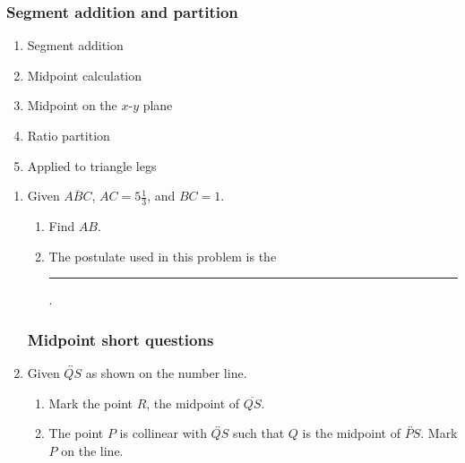 \documentclass[12pt, twoside]{article}
\begin{document}
\subsubsection*{Segment addition and partition}
\begin{enumerate}
  \item Segment addition
  \item Midpoint calculation
  \item Midpoint on the $x$-$y$ plane
  \item Ratio partition
  \item Applied to triangle legs
  \end{enumerate}

\begin{enumerate}
\subsubsection*{Segment addition short questions}
  \item Given $\overline{ABC}$, $AC=5 \frac{1}{3}$, and $BC=1$.
    \begin{enumerate}
      \item Find ${AB}$.\\[0.75cm]
         \bigskip
      \item The postulate used in this problem is the \rule{6cm}{0.15mm}.
      \end{enumerate}

\subsubsection*{Midpoint short questions}
  \item Given $\overleftrightarrow{QS}$ as shown on the number line. \\[10pt]
    \begin{enumerate}
      \item Mark the point $R$, the midpoint of $\overline{QS}$.
      \item The point $P$ is collinear with $\overleftrightarrow{QS}$ such that $Q$ is the midpoint of $\overleftrightarrow{PS}$. Mark $P$ on the line.
      \end{enumerate}


\end{enumerate}
\end{document}
